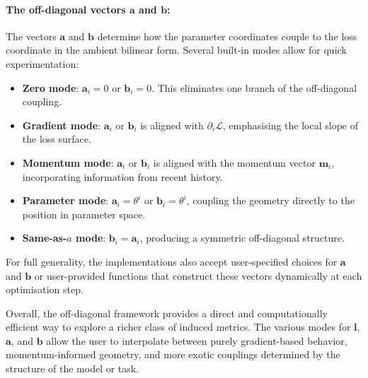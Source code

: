 \documentclass{article}
\newcommand{\loss}{\mathcal{L}}
\newcommand{\vecb}[1]{\boldsymbol{#1}}
\begin{document}
\paragraph{The off-diagonal vectors $\vecb{a}$ and $\vecb{b}$:}
The vectors $\vecb{a}$ and $\vecb{b}$ determine how the parameter coordinates couple to the
loss coordinate in the ambient bilinear form.
Several built-in modes allow for quick experimentation:
\begin{itemize}
    \item \textbf{Zero mode}: 
    $\vecb{a}_i=0$ or $\vecb{b}_i=0$.
    This eliminates one branch of the off-diagonal coupling.

    \item \textbf{Gradient mode}: 
    $\vecb{a}_i$ or $\vecb{b}_i$ is aligned with
    $\partial_i \loss$, emphasising the local slope of the loss surface.

    \item \textbf{Momentum mode}: 
    $\vecb{a}_i$ or $\vecb{b}_i$ is aligned with the
    momentum vector $\vecb{m}_i$, incorporating information from recent history.

    \item \textbf{Parameter mode}: 
    $\vecb{a}_i=\theta^i$ or $\vecb{b}_i=\theta^i$,
    coupling the geometry directly to the position in parameter space.

    \item \textbf{Same-as-$a$ mode}: 
    $\vecb{b}_i=\vecb{a}_i$, producing a symmetric
    off-diagonal structure.
\end{itemize}
For full generality, the implementations also accept user-specified choices
for $\vecb{a}$ and $\vecb{b}$ or user-provided functions that construct these vectors
dynamically at each optimisation step.

Overall, the off-diagonal framework provides a direct and computationally
efficient way to explore a richer class of induced metrics.
The various modes for $\vecb{l}$, $\vecb{a}$, and $\vecb{b}$ allow the user to interpolate
between purely gradient-based behavior, momentum-informed geometry,
and more exotic couplings determined by the structure of the model or task.
















\end{document}
